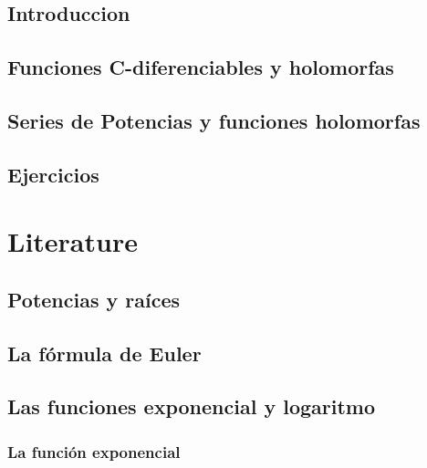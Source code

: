 \documentclass[]{book}
\theoremstyle{definition}
\theoremstyle{definition}
\theoremstyle{definition}
\theoremstyle{remark}
\begin{document}
\hypertarget{introduccion}{%
\section{Introduccion}\label{introduccion}}

\hypertarget{funciones-c-diferenciables-y-holomorfas}{%
\section{Funciones C-diferenciables y holomorfas}\label{funciones-c-diferenciables-y-holomorfas}}

\hypertarget{series-de-potencias-y-funciones-holomorfas}{%
\section{Series de Potencias y funciones holomorfas}\label{series-de-potencias-y-funciones-holomorfas}}

\hypertarget{ejercicios-1}{%
\section{Ejercicios}\label{ejercicios-1}}

\hypertarget{literature}{%
\chapter{Literature}\label{literature}}

\hypertarget{potencias-y-rauxedces}{%
\section{Potencias y raíces}\label{potencias-y-rauxedces}}

\hypertarget{la-fuxf3rmula-de-euler}{%
\section{La fórmula de Euler}\label{la-fuxf3rmula-de-euler}}

\hypertarget{las-funciones-exponencial-y-logaritmo}{%
\section{Las funciones exponencial y logaritmo}\label{las-funciones-exponencial-y-logaritmo}}

\hypertarget{la-funciuxf3n-exponencial}{%
\subsection{La función exponencial}\label{la-funciuxf3n-exponencial}}
\end{document}
